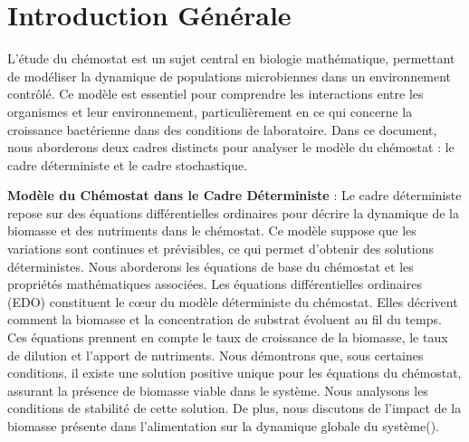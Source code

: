 \documentclass[12pt,a4paper]{report}%
\begin{document}
\chapter*{Introduction Générale}
\vspace*{0.1cm}
L'étude du chémostat est un sujet central en biologie mathématique, permettant de modéliser la dynamique de populations microbiennes dans un environnement contrôlé. Ce modèle est essentiel pour comprendre les interactions entre les organismes et leur environnement, particulièrement en ce qui concerne la croissance bactérienne dans des conditions de laboratoire. Dans ce document, nous aborderons deux cadres distincts pour analyser le modèle du chémostat : le cadre déterministe et le cadre stochastique.\\
\vspace*{0.3cm}

{\bf   Modèle du Chémostat dans le Cadre Déterministe} : Le cadre déterministe repose sur des équations différentielles ordinaires pour décrire la dynamique de la biomasse et des nutriments dans le chémostat. Ce modèle suppose que les variations sont continues et prévisibles, ce qui permet d'obtenir des solutions déterministes. Nous aborderons les équations de base du chémostat et les propriétés mathématiques associées. Les équations différentielles ordinaires (EDO) constituent le cœur du modèle déterministe du chémostat. Elles décrivent comment la biomasse et la concentration de substrat évoluent au fil du temps. Ces équations prennent en compte le taux de croissance de la biomasse, le taux de dilution et l'apport de nutriments. Nous démontrons que, sous certaines conditions, il existe une solution positive unique pour les équations du chémostat, assurant la présence de biomasse viable dans le système. Nous analysons les conditions de stabilité de cette solution. De plus, nous discutons de l’impact de la biomasse présente dans l’alimentation sur la dynamique globale du système(\cite{d}).\\
\vspace*{0.3cm}
\end{document}
